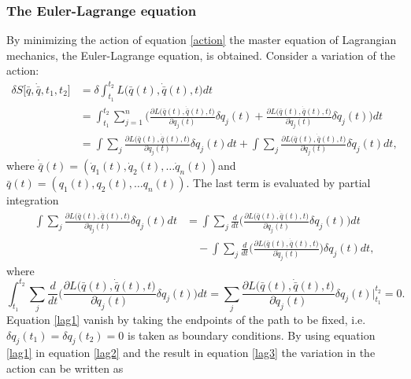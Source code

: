 \subsubsection*{The Euler-Lagrange equation}
By minimizing the action of equation \eqref{action} the master equation of Lagrangian mechanics, the Euler-Lagrange equation, is obtained. Consider a variation of the action:
\begin{equation}
	\begin{split}
		\delta S\big[\bar{q},\dot{\bar{q}}, t_1,t_2\big]
		&=\delta\int_{t_1}^{t_2} L\big(\bar{q}(t),\dot{\bar{q}}(t),t\big)dt\\
		&=\int_{t_1}^{t_2}\sum_{j=1}^{n}\bigg(\frac{\partial L\big(\bar{q}(t),\dot{\bar{q}}(t),t\big)}{\partial q_j(t)}\delta q_j(t)+\frac{\partial L\big(\bar{q}(t),\dot{\bar{q}}(t),t\big)}{\partial \dot{q}_j(t)}\delta \dot{q}_j(t)\bigg)dt\\
		&=\int\sum_{j}\frac{\partial L\big(\bar{q}(t),\dot{\bar{q}}(t),t\big)}{\partial q_j(t)}\delta q_j(t)dt+\int\sum_{j}\frac{\partial L\big(\bar{q}(t),\dot{\bar{q}}(t),t\big)}{\partial \dot{q}_j(t)}\delta \dot{q}_j(t)dt,
	\end{split}
	\label{lag3}
\end{equation} 
where $\dot{\bar{q}}(t)=(\dot{q}_1(t), \dot{q}_2(t),\dots\dot{q}_n(t))$\normalsize and $\bar{q}(t)=(q_1(t), q_2(t),\dots q_n(t))$\normalsize. The last term is evaluated by partial integration
\begin{equation}
	\begin{split}
		\int\sum_{j}\frac{\partial L\big(\bar{q}(t),\dot{\bar{q}}(t),t\big)}{\partial \dot{q}_j(t)}\delta \dot{q}_j(t)dt&=\int\sum_{j}\frac{d}{dt}\bigg(\frac{\partial L\big(\bar{q}(t),\dot{\bar{q}}(t),t\big)}{\partial \dot{q}_j(t)}\delta q_j(t)\bigg)dt\\
		&\quad-\int\sum_{j}\frac{d}{dt}\bigg(\frac{\partial L\big(\bar{q}(t),\dot{\bar{q}}(t),t\big)}{\partial \dot{q}_j(t)}\bigg)\delta q_j(t)dt,
	\end{split}
	\label{lag2}
\end{equation} 
where
\begin{equation}
	\int_{t_1}^{t_2}\sum_{j}\frac{d}{dt}\bigg(\frac{\partial L\big(\bar{q}(t),\dot{\bar{q}}(t),t\big)}{\partial \dot{q}_j(t)}\delta q_j(t)\bigg)dt=\sum_{j}\frac{\partial L\big(\bar{q}(t),\dot{\bar{q}}(t),t\big)}{\partial \dot{q}_j(t)}\delta q_j(t)\bigg|_{t_1}^{t_2}=0.
	\label{lag1}
\end{equation} 
Equation \eqref{lag1} vanish by taking the endpoints of the path to be fixed, i.e. $\delta q_j(t_1)=\delta q_j(t_2)=0$ is taken as boundary conditions. By using equation \eqref{lag1} in equation \eqref{lag2} and the result in equation \eqref{lag3} the variation in the action can be written as
